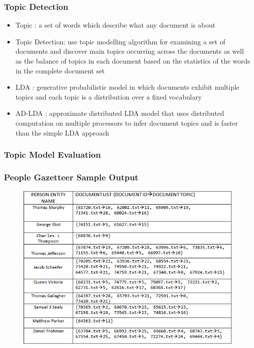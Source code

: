 \documentclass{beamer}
\begin{document}
\begin{frame}
\frametitle{Topic Detection}
\begin{itemize}
\item
\alert{Topic} : a set of words which describe what any document is about
\item
\alert{Topic Detection}: use topic modelling algorithm for examining a set of documents and discover main topics occurring across the documents as well as the balance of topics in each document based on the statistics of the words in the complete document set
\item
\alert{LDA} :  generative probabilistic model in which documents exhibit multiple topics and each topic is a distribution over a fixed vocabulary
\item
\alert{AD-LDA} : approximate distributed LDA model that uses distributed computation on multiple processors to infer document topics and is faster than the simple LDA approach
\end{itemize}
\end{frame}

\begin{frame}
\frametitle{Topic Model Evaluation}
\end{frame}

\begin{frame}
\frametitle{People Gazetteer Sample Output}
\begin{figure}[ht]
\begin{center}
\includegraphics[scale=0.7]{images/gazetteer.png}
\end{center}
\end{figure}
\end{frame}
\end{document}
